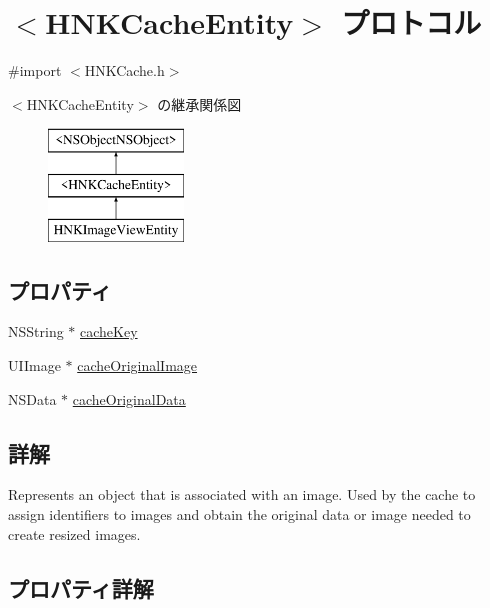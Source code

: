 \hypertarget{protocol_h_n_k_cache_entity-p}{}\section{$<$H\+N\+K\+Cache\+Entity$>$ プロトコル}
\label{protocol_h_n_k_cache_entity-p}


{\ttfamily \#import $<$H\+N\+K\+Cache.\+h$>$}

$<$H\+N\+K\+Cache\+Entity$>$ の継承関係図\begin{figure}[H]
\begin{center}
\leavevmode
\includegraphics[height=3.000000cm]{protocol_h_n_k_cache_entity-p}
\end{center}
\end{figure}
\subsection*{プロパティ}
\begin{DoxyCompactItemize}
\item 
N\+S\+String $\ast$ \hyperlink{protocol_h_n_k_cache_entity-p_aaedc8909c0704cdf10effcd7975b6464}{cache\+Key}
\item 
U\+I\+Image $\ast$ \hyperlink{protocol_h_n_k_cache_entity-p_ab9759c29a625125e6eefc9d7786b6c8a}{cache\+Original\+Image}
\item 
N\+S\+Data $\ast$ \hyperlink{protocol_h_n_k_cache_entity-p_a7a5e58d8e3af6b7c72f5db77602f51f7}{cache\+Original\+Data}
\end{DoxyCompactItemize}


\subsection{詳解}
Represents an object that is associated with an image. Used by the cache to assign identifiers to images and obtain the original data or image needed to create resized images. 

\subsection{プロパティ詳解}
\hypertarget{protocol_h_n_k_cache_entity-p_aaedc8909c0704cdf10effcd7975b6464}{}

